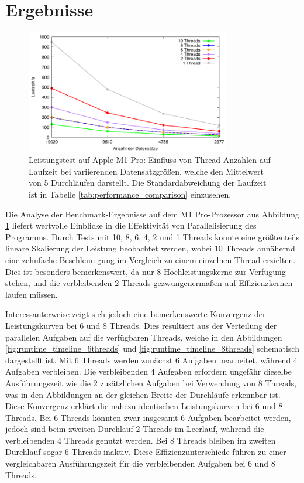 \section{Ergebnisse}
\label{sec:results}

\begin{figure}[H]
\centering
\includegraphics[width=0.8\textwidth]{../results/plots/m1pro/comp_all_threads.pdf}
\caption{Leistungstest auf Apple M1 Pro: Einfluss von Thread-Anzahlen auf Laufzeit bei variierenden Datensatzgrößen, welche den Mittelwert von 5 Durchläufen darstellt. Die Standardabweichung der Laufzeit ist in Tabelle \ref{tab:performance_comparison} einzusehen.}
\label{fig:m1pro_benchmark_threads}
\end{figure}

Die Analyse der Benchmark-Ergebnisse auf dem M1 Pro-Prozessor aus Abbildung \ref{fig:m1pro_benchmark_threads} liefert wertvolle Einblicke in die Effektivität von Parallelisierung des Programms. Durch Tests mit 10, 8, 6, 4, 2 und 1 Threads konnte eine größtenteils lineare Skalierung der Leistung beobachtet werden, wobei 10 Threads annähernd eine zehnfache Beschleunigung im Vergleich zu einem einzelnen Thread erzielten. Dies ist besonders bemerkenswert, da nur 8 Hochleistungskerne zur Verfügung stehen, und die verbleibenden 2 Threads gezwungenermaßen auf Effizienzkernen laufen müssen.

Interessanterweise zeigt sich jedoch eine bemerkenswerte Konvergenz der Leistungskurven bei 6 und 8 Threads. Dies resultiert aus der Verteilung der parallelen Aufgaben auf die verfügbaren Threads, welche in den Abbildungen \ref{fig:runtime_timeline_6threads} und \ref{fig:runtime_timeline_8threads} schematisch dargestellt ist. Mit 6 Threads werden zunächst 6 Aufgaben bearbeitet, während 4 Aufgaben verbleiben. Die verbleibenden 4 Aufgaben erfordern ungefähr dieselbe Ausführungszeit wie die 2 zusätzlichen Aufgaben bei Verwendung von 8 Threads, was in den Abbildungen an der gleichen Breite der Durchläufe erkennbar ist. Diese Konvergenz erklärt die nahezu identischen Leistungskurven bei 6 und 8 Threads.
Bei 6 Threads könnten zwar insgesamt 6 Aufgaben bearbeitet werden, jedoch sind beim zweiten Durchlauf 2 Threads im Leerlauf, während die verbleibenden 4 Threads genutzt werden. Bei 8 Threads bleiben im zweiten Durchlauf sogar 6 Threads inaktiv. Diese Effizienzunterschiede führen zu einer vergleichbaren Ausführungszeit für die verbleibenden Aufgaben bei 6 und 8 Threads.

